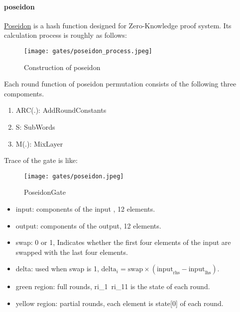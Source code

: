 \paragraph{poseidon}

\href{https://www.poseidon-hash.info/}{Poseidon} is a hash function designed for Zero-Knowledge proof system.
Its calculation process is roughly as follows:

\begin{figure}[!ht]
    \centering
    \texttt{[image: gates/poseidon\_process.jpeg]}
    \caption{Construction of poseidon}
    \label{fig:poseidon-process}
\end{figure}

Each round function of poseidon permutation consists of the following three compoments.
\begin{enumerate}
    \item ARC(.): AddRoundConstants
    \item S: SubWords
    \item M(.): MixLayer
\end{enumerate}

Trace of the gate is like:
\begin{figure}[!ht]
    \centering
    \texttt{[image: gates/poseidon.jpeg]}
    \caption{PoseidonGate}
    \label{fig:poseidon-gate}
\end{figure}

\begin{itemize}
    \item input: components of the input , 12 elements.
    \item output: components of the output, 12 elements.
    \item swap: 0 or 1, Indicates whether the first four elements of the input are swapped with the last four elements.
    \item delta: used when swap is 1, $\text{delta}_i = \text{swap} \times (\text{input}_{\text{rhs}} - \text{input}_{\text{lhs}})$.
    \item green region: full rounds, ri\_1~ri\_11 is the state of each round.
    \item yellow region: partial rounds, each element is state[0] of each round.
\end{itemize}

